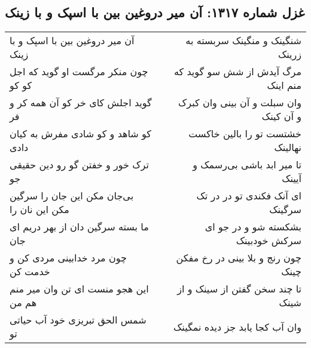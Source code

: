 \begin{center}
\section*{غزل شماره ۱۳۱۷: آن میر دروغین بین با اسپک و با زینک}
\label{sec:1317}
\begin{longtable}{l p{0.5cm} r}
آن میر دروغین بین با اسپک و با زینک
&&
شنگینک و منگینک سربسته به زرینک
\\
چون منکر مرگست او گوید که اجل کو کو
&&
مرگ آیدش از شش سو گوید که منم اینک
\\
گوید اجلش کای خر کو آن همه کر و فر
&&
وان سبلت و آن بینی وان کبرک و آن کینک
\\
کو شاهد و کو شادی مفرش به کیان دادی
&&
خشتست تو را بالین خاکست نهالینک
\\
ترک خور و خفتن گو رو دین حقیقی جو
&&
تا میر ابد باشی بی‌رسمک و آیینک
\\
بی‌جان مکن این جان را سرگین مکن این نان را
&&
ای آنک فکندی تو در در تک سرگینک
\\
ما بسته سرگین دان از بهر دریم ای جان
&&
بشکسته شو و در جو ای سرکش خودبینک
\\
چون مرد خدابینی مردی کن و خدمت کن
&&
چون رنج و بلا بینی در رخ مفکن چینک
\\
این هجو منست ای تن وان میر منم هم من
&&
تا چند سخن گفتن از سینک و از شینک
\\
شمس الحق تبریزی خود آب حیاتی تو
&&
وان آب کجا یابد جز دیده نمگینک
\\
\end{longtable}
\end{center}
